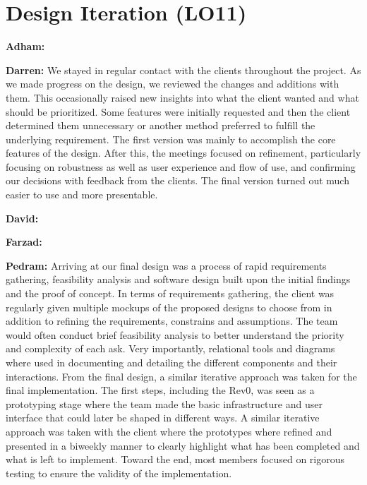 \documentclass{article}
\begin{document}
\section{Design Iteration (LO11)}


\textbf{Adham:}

\textbf{Darren:} We stayed in regular  contact with the clients throughout the project. As we made progress on the design, we reviewed the changes and additions with them. This occasionally raised new insights into what the client wanted and what should be prioritized. Some features were initially requested and then the client determined them unnecessary or another method preferred to fulfill the underlying requirement. The first version was mainly to accomplish the core features of the design. After this, the meetings focused on refinement, particularly focusing on robustness as well as user experience and flow of use, and confirming our decisions with feedback from the clients. The final version turned out much easier to use and more presentable.

\textbf{David:}

\textbf{Farzad:}

\textbf{Pedram:} Arriving at our final design was a process of rapid requirements gathering, feasibility analysis and software design built upon the initial findings and the proof of concept. In terms of requirements gathering, the client was regularly given multiple mockups of the proposed designs to choose from in addition to refining the requirements, constrains and assumptions. The team would often conduct brief feasibility analysis to better understand the priority and complexity of each ask. Very importantly, relational tools and diagrams where used in documenting and detailing the different components and their interactions.  From the final design, a similar iterative approach was taken for the final implementation. The first steps, including the Rev0, was seen as a prototyping stage where the team made the basic infrastructure and user interface that could later be shaped in different ways. A similar iterative approach was taken with the client where the prototypes where refined and presented in a biweekly manner to clearly highlight what has been completed and what is left to implement. Toward the end, most members focused on rigorous testing to ensure the validity of the implementation. 
\end{document}
